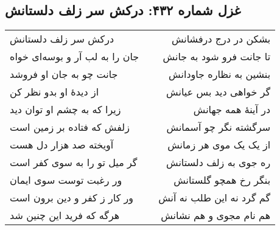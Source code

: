\begin{center}
\section*{غزل شماره ۴۳۲: درکش سر زلف دلستانش}
\label{sec:432}
\begin{longtable}{l p{0.5cm} r}
درکش سر زلف دلستانش
&&
بشکن در درج درفشانش
\\
جان را به لب آر و بوسه‌ای خواه
&&
تا جانت فرو شود به جانش
\\
جانت چو به جان او فروشد
&&
بنشین به نظاره جاودانش
\\
از دیدهٔ او بدو نظر کن
&&
گر خواهی دید بس عیانش
\\
زیرا که به چشم او توان دید
&&
در آینهٔ همه جهانش
\\
زلفش که فتاده بر زمین است
&&
سرگشته نگر چو آسمانش
\\
آویخته صد هزار دل هست
&&
از یک یک موی هر زمانش
\\
گر میل تو را به سوی کفر است
&&
ره جوی به زلف دلستانش
\\
ور رغبت توست سوی ایمان
&&
بنگر رخ همچو گلستانش
\\
ور کار ز کفر و دین برون است
&&
گم گرد نه این طلب نه آنش
\\
هرگه که فرید این چنین شد
&&
هم نام مجوی و هم نشانش
\\
\end{longtable}
\end{center}
